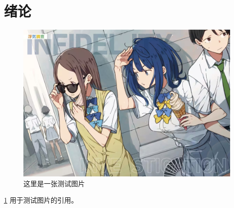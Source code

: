 \documentclass[\main/main.tex]{subfiles}
\begin{document}
\section{绪论}

\zhlipsum[3]

\begin{figure}[htb!]
  \centering
  \includegraphics[width = 0.7\linewidth]{figures/test_1.jpg}
  \caption{这里是一张测试图片}
  \label{这里是一张测试图片}
\end{figure}

\cref{这里是一张测试图片} 用于测试图片的引用。

\zhlipsum[4-7]
\end{document}
